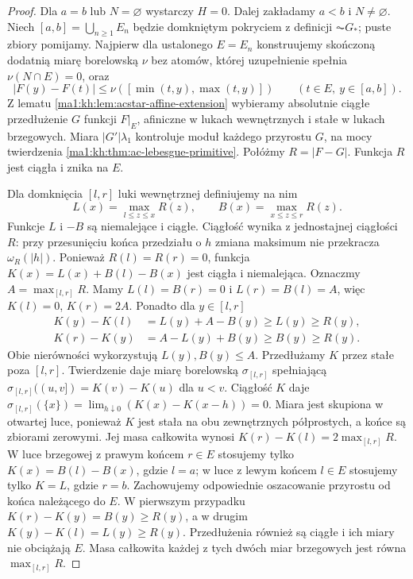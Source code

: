 \begin{proof}
Dla $a=b$ lub $N=\varnothing$ wystarczy $H=0$.
Dalej zakładamy $a<b$ i $N\ne\varnothing$.
Niech $[a,b]=\bigcup_{n\ge1}E_n$ będzie domkniętym pokryciem
z definicji $\AC G_*$; puste zbiory pomijamy. Najpierw dla
ustalonego $E=E_n$ konstruujemy skończoną dodatnią miarę
borelowską $\nu$ bez atomów, której uzupełnienie spełnia $\nu(N\cap E)=0$, oraz
\[
 |F(y)-F(t)|\le\nu([\min(t,y),\max(t,y)])
 \qquad(t\in E,\ y\in[a,b]).
\]
Z lematu \ref{ma1:kh:lem:acstar-affine-extension} wybieramy
absolutnie ciągłe przedłużenie $G$ funkcji $F|_E$, afiniczne
w lukach wewnętrznych i stałe w lukach brzegowych.
Miara $|G'|\lambda_1$ kontroluje moduł każdego przyrostu $G$,
na mocy twierdzenia \ref{ma1:kh:thm:ac-lebesgue-primitive}.
Połóżmy $R=|F-G|$. Funkcja $R$ jest ciągła i znika na $E$.

Dla domknięcia $[l,r]$ luki wewnętrznej definiujemy na nim
\[
 L(x)=\max_{l\le z\le x}R(z),\qquad
 B(x)=\max_{x\le z\le r}R(z).
\]
Funkcje $L$ i $-B$ są niemalejące i ciągłe. Ciągłość wynika
z jednostajnej ciągłości $R$: przy przesunięciu końca
przedziału o $h$ zmiana maksimum nie przekracza $\omega_R(|h|)$.
Ponieważ $R(l)=R(r)=0$, funkcja
$K(x)=L(x)+B(l)-B(x)$ jest ciągła i niemalejąca.
Oznaczmy $A=\max_{[l,r]}R$. Mamy
$L(l)=B(r)=0$ i $L(r)=B(l)=A$, więc $K(l)=0$,
$K(r)=2A$. Ponadto dla $y\in[l,r]$
\[
\begin{aligned}
 K(y)-K(l)&=L(y)+A-B(y)\ge L(y)\ge R(y),\\
 K(r)-K(y)&=A-L(y)+B(y)\ge B(y)\ge R(y).
\end{aligned}
\]
Obie nierówności wykorzystują $L(y),B(y)\le A$.
Przedłużamy $K$ przez stałe poza $[l,r]$.
Twierdzenie
daje miarę borelowską $\sigma_{[l,r]}$ spełniającą
$\sigma_{[l,r]}((u,v])=K(v)-K(u)$ dla $u<v$.
Ciągłość $K$ daje
$\sigma_{[l,r]}(\{x\})=\lim_{h\downarrow0}(K(x)-K(x-h))=0$.
Miara jest skupiona w otwartej luce, ponieważ $K$ jest
stała na obu zewnętrznych półprostych, a końce są
zbiorami zerowymi. Jej masa całkowita wynosi
$K(r)-K(l)=2\max_{[l,r]}R$.
W luce brzegowej z prawym końcem $r\in E$ stosujemy tylko
$K(x)=B(l)-B(x)$, gdzie $l=a$; w luce z lewym końcem $l\in E$
stosujemy tylko $K=L$, gdzie $r=b$. Zachowujemy odpowiednie
oszacowanie przyrostu od końca należącego do $E$.
W pierwszym przypadku $K(r)-K(y)=B(y)\ge R(y)$,
a w drugim $K(y)-K(l)=L(y)\ge R(y)$.
Przedłużenia również są ciągłe i ich miary nie obciążają $E$.
Masa całkowita każdej z tych dwóch miar brzegowych
jest równa $\max_{[l,r]}R$.


\end{proof}
